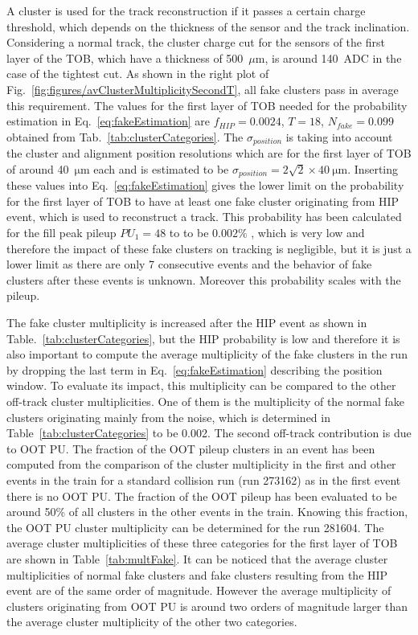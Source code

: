 A cluster is used for the track reconstruction if it passes a certain charge threshold, which depends on the thickness of the sensor and the track inclination. Considering a normal track, the cluster charge cut for the sensors of the first layer of the TOB, which have a thickness of 500~$\mu$m, is around 140~ADC in the case of the tightest cut. As shown in the right plot of Fig.~\ref{fig:figures/avClusterMultiplicitySecondT}, all fake clusters pass in average this requirement. The values for the first layer of TOB needed for the probability estimation in Eq.~\ref{eq:fakeEstimation} are $f_{HIP} = 0.0024$, $T = 18$, $N_{fake} =0.099$ obtained from Tab.~\ref{tab:clusterCategories}. The $\sigma_{position}$ is taking into account the cluster and alignment position resolutions which are for the first layer of TOB of around 40~$\mathrm{\mu m}$ each and is estimated to be $\sigma_{position} = 2 \sqrt{2} \times 40 ~\mathrm{\mu m}$. Inserting these values into Eq.~\ref{eq:fakeEstimation} gives the lower limit on the probability for the first layer of TOB to have at least one fake cluster originating from HIP event,  which is used to reconstruct a track. This probability has been calculated for the fill peak pileup $PU_{1} = 48$ to to be $0.002\%$ , which is very low and therefore the impact of these fake clusters on tracking is negligible, but it is just a lower limit as there are only 7 consecutive events and the behavior of fake clusters after these events is unknown. Moreover this probability scales with the pileup. %

The fake cluster multiplicity is increased after the HIP event as shown in Table.~\ref{tab:clusterCategories}, but the HIP probability is low and therefore it is also important to compute the average multiplicity of the fake clusters in the run by dropping the last term in Eq.~\ref{eq:fakeEstimation} describing the position window. To evaluate its impact, this multiplicity can be compared to the other off-track cluster multiplicities. One of them is the multiplicity of the normal fake clusters originating mainly from the noise, which is determined in Table~\ref{tab:clusterCategories} to be 0.002. The second off-track contribution is due to OOT PU. The fraction of the OOT pileup clusters in an event has been computed from the comparison of the cluster multiplicity in the first and other events in the train for a standard collision run (run 273162) as in the first event there is no OOT PU. The fraction of the OOT pileup has been evaluated to be around 50\% of all clusters in the other events in the train. Knowing this fraction, the OOT PU cluster multiplicity can be determined for the run 281604. The average cluster multiplicities of these three categories for the first layer of TOB are shown in Table~\ref{tab:multFake}. It can be noticed that the average cluster multiplicities of normal fake clusters and fake clusters resulting from the HIP event are of the same order of magnitude. However the average multiplicity of clusters originating from OOT PU is around two orders of magnitude larger than the  average cluster multiplicity of the other two categories.  


